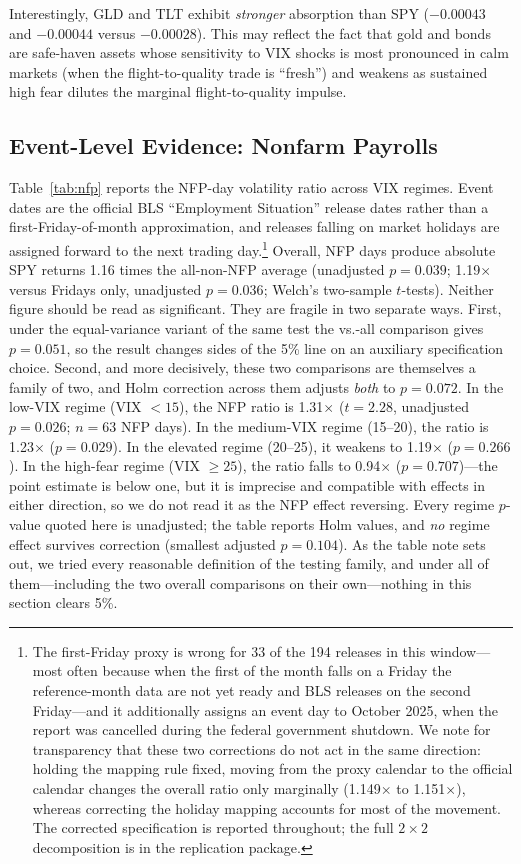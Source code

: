 \documentclass[12pt,a4paper]{article}
\begin{document}
Interestingly, GLD and TLT exhibit \textit{stronger} absorption than SPY ($-0.00043$ and $-0.00044$ versus $-0.00028$). This may reflect the fact that gold and bonds are safe-haven assets \citep{baur2010} whose sensitivity to VIX shocks is most pronounced in calm markets (when the flight-to-quality trade is ``fresh'') and weakens as sustained high fear dilutes the marginal flight-to-quality impulse.

\subsection{Event-Level Evidence: Nonfarm Payrolls}
\label{sec:nfp}

Table~\ref{tab:nfp} reports the NFP-day volatility ratio across VIX regimes. Event dates are the official BLS ``Employment Situation'' release dates rather than a first-Friday-of-month approximation, and releases falling on market holidays are assigned forward to the next trading day.\footnote{The first-Friday proxy is wrong for 33 of the 194 releases in this window---most often because when the first of the month falls on a Friday the reference-month data are not yet ready and BLS releases on the second Friday---and it additionally assigns an event day to October 2025, when the report was cancelled during the federal government shutdown. We note for transparency that these two corrections do not act in the same direction: holding the mapping rule fixed, moving from the proxy calendar to the official calendar changes the overall ratio only marginally (1.149$\times$ to 1.151$\times$), whereas correcting the holiday mapping accounts for most of the movement. The corrected specification is reported throughout; the full $2\times2$ decomposition is in the replication package.} Overall, NFP days produce absolute SPY returns 1.16 times the all-non-NFP average (unadjusted $p = 0.039$; 1.19$\times$ versus Fridays only, unadjusted $p = 0.036$; Welch's two-sample $t$-tests). Neither figure should be read as significant. They are fragile in two separate ways. First, under the equal-variance variant of the same test the vs.-all comparison gives $p = 0.051$, so the result changes sides of the 5\% line on an auxiliary specification choice. Second, and more decisively, these two comparisons are themselves a family of two, and Holm correction across them adjusts \textit{both} to $p = 0.072$. In the low-VIX regime (VIX $< 15$), the NFP ratio is 1.31$\times$ ($t = 2.28$, unadjusted $p = 0.026$; $n = 63$ NFP days). In the medium-VIX regime (15--20), the ratio is 1.23$\times$ ($p = 0.029$). In the elevated regime (20--25), it weakens to 1.19$\times$ ($p = 0.266$). In the high-fear regime (VIX $\geq 25$), the ratio falls to 0.94$\times$ ($p = 0.707$)---the point estimate is below one, but it is imprecise and compatible with effects in either direction, so we do not read it as the NFP effect reversing. Every regime $p$-value quoted here is unadjusted; the table reports Holm values, and \textit{no} regime effect survives correction (smallest adjusted $p = 0.104$). As the table note sets out, we tried every reasonable definition of the testing family, and under all of them---including the two overall comparisons on their own---nothing in this section clears 5\%.
\end{document}

